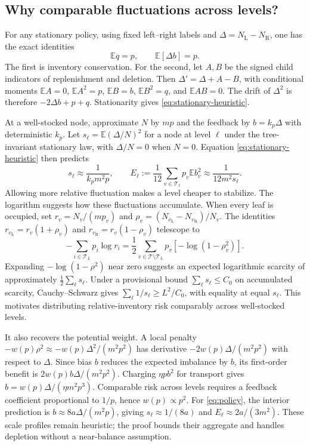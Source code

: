 \documentclass[11pt]{article}
\numberwithin{equation}{section}
\theoremstyle{remark}
\newcommand{\E}{\mathbb E}
\newcommand{\T}{\mathcal T}
\begin{document}
\subsection{Why comparable fluctuations across levels?}

For any stationary policy, using fixed left--right labels and
\(\Delta=N_{\mathrm L}-N_{\mathrm R}\), one has the exact identities
\begin{equation}\label{eq:stationary-heuristic}
\E q=p,\qquad \E[\Delta b]=p.
\end{equation}
The first is inventory conservation. For the second, let \(A,B\) be the
signed child indicators of replenishment and deletion. Then
\(\Delta'=\Delta+A-B\), with conditional moments
\(\E A=0\), \(\E A^2=p\), \(\E B=b\), \(\E B^2=q\), and
\(\E AB=0\). The drift of \(\Delta^2\) is therefore
\(-2\Delta b+p+q\). Stationarity gives \eqref{eq:stationary-heuristic}.

At a well-stocked node, approximate \(N\) by \(mp\) and the feedback by
\(b=k_p\Delta\) with deterministic \(k_p\). Let
\(s_\ell=\E(\Delta/N)^2\) for a node at level \(\ell\) under the
tree-invariant stationary law, with \(\Delta/N=0\) when \(N=0\). Equation
\eqref{eq:stationary-heuristic} then predicts
\[
s_\ell\approx\frac1{k_pm^2p},\qquad
E_\ell:=\frac1{12}\sum_{v\in\T_\ell}p_v\E b_v^2
\approx\frac1{12m^2s_\ell}.
\]
Allowing more relative fluctuation makes a level cheaper to stabilize.
The logarithm suggests how these fluctuations accumulate. When every
leaf is occupied, set \(r_v=N_v/(mp_v)\) and
\(\rho_v=(N_{v_{\mathrm L}}-N_{v_{\mathrm R}})/N_v\).
The identities \(r_{v_{\mathrm L}}=r_v(1+\rho_v)\) and
\(r_{v_{\mathrm R}}=r_v(1-\rho_v)\) telescope to
\[
-\sum_{i\in\T_L}p_i\log r_i
=\frac12\sum_{v\in\T\setminus\T_L}p_v[-\log(1-\rho_v^2)]
.
\]
Expanding \(-\log(1-\rho^2)\) near zero suggests an expected logarithmic
scarcity of approximately \(\frac12\sum_\ell s_\ell\). Under a
provisional bound \(\sum_\ell s_\ell\le C_0\) on accumulated scarcity,
Cauchy--Schwarz gives
\(\sum_\ell1/s_\ell\ge L^2/C_0\), with equality at equal
\(s_\ell\). This motivates distributing relative-inventory risk
comparably across well-stocked levels.

It also recovers the potential weight. A local penalty
\(-w(p)\rho^2\approx-w(p)\Delta^2/(m^2p^2)\) has derivative
\(-2w(p)\Delta/(m^2p^2)\) with respect to \(\Delta\). Since bias \(b\)
reduces the expected imbalance by \(b\), its first-order benefit is
\(2w(p)b\Delta/(m^2p^2)\). Charging \(\eta pb^2\) for transport
gives \(b=w(p)\Delta/(\eta m^2p^3)\). Comparable risk across levels
requires a feedback coefficient proportional to \(1/p\), hence
\(w(p)\propto p^2\).
For \eqref{eq:policy}, the interior prediction is
\(b\approx8a\Delta/(m^2p)\), giving \(s_\ell\approx1/(8a)\)
and \(E_\ell\approx2a/(3m^2)\). These scale profiles remain heuristic;
the proof bounds their aggregate and handles depletion without a
near-balance assumption.
\end{document}
